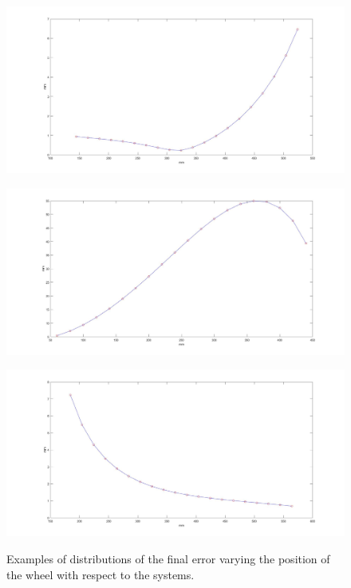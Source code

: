   \begin{figure}[t!]
    \centering
    \begin{minipage}[c]{0.9\textwidth}
      \centering
      \includegraphics[width=\textwidth]{./images/diameter/distrib1.jpg}
      \label{fig:diam:dists1}
    \end{minipage}
    \vfill
    \begin{minipage}[c]{0.9\textwidth}
      \centering
      \includegraphics[width=\textwidth]{./images/diameter/distrib2.jpg}
      \label{fig:diam:dists2}
    \end{minipage}
    \vfill
    \begin{minipage}[c]{0.9\textwidth}
      \centering
      \includegraphics[width=\textwidth]{./images/diameter/distrib3.jpg}
      \label{fig:diam:dists3}
    \end{minipage}
    
    \caption{Examples of distributions of the final error varying the position of the wheel with respect to the systems.}
    \label{fig:diam:dists}
  \end{figure}
